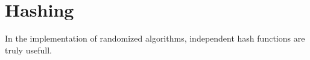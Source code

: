 \documentclass[../main.tex]{subfiles}
\begin{document}
\section*{Hashing}
In the implementation of randomized algorithms, independent hash functions are truly usefull.
\end{document}
